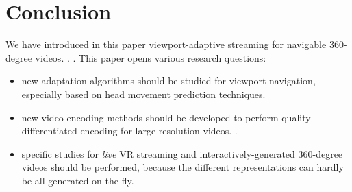 \section{Conclusion}
\label{sec:conclusion}

We have introduced in this paper viewport-adaptive streaming for
navigable 360-degree videos. .
. This
paper opens various research questions:
\begin{itemize}
  \item new adaptation algorithms should be studied for viewport navigation,
especially based on head movement prediction techniques.

  \item new video encoding methods should be
developed to perform quality-differentiated encoding for
large-resolution videos. .
\item specific studies for \emph{live} \ac{VR} streaming
and interactively-generated 360-degree videos should be performed,
because the different representations can hardly be all
generated on the fly.
\end{itemize}

